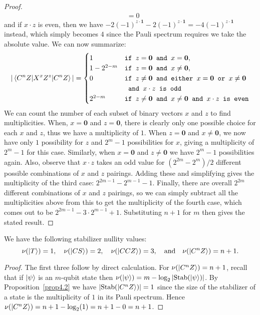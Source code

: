 \documentclass[12pt]{dalthesis}
\begin{document}
\begin{proof}
\begin{equation*}
\begin{split}
& = 0
\end{split}
\end{equation*}
and if $x \cdot z$ is even, then we have $-2(-1)^{z \cdot \textbf{1}} - 2(-1)^{z \cdot \textbf{1}} = -4(-1)^{z \cdot \textbf{1}}$ instead, which simply becomes $4$ since the Pauli spectrum requires we take the absolute value. We can now summarize:
\begin{equation*}
|\braket{C^n Z|X^xZ^z|C^n Z}| = \begin{cases}
1 & \texttt{if } z = \textbf{0} \texttt{ and } x = \textbf{0}, \\
1 - 2^{2-m} & \texttt{if } z = \textbf{0} \texttt{ and } x \neq \textbf{0}, \\
0 & \texttt{if } z \neq \textbf{0} \texttt{ and either } x = \textbf{0} \texttt{ or } x \neq \textbf{0} \\
& \texttt{ and }x \cdot z \texttt{ is odd} \\
2^{2-m} & \texttt{if } z \neq \textbf{0} \texttt{ and } x \neq \textbf{0}
 \texttt{ and } x \cdot z \texttt{ is even}
\end{cases}
\end{equation*}
We can count the number of each subset of binary vectors $x$ and $z$ to find multiplicities. When, $x=\textbf{0}$ and $z = \textbf{0}$, there is clearly only one possible choice for each $x$ and $z$, thus we have a multiplicity of $1$. When $z = \textbf{0}$ and $x \neq \textbf{0}$, we now have only $1$ possibility for $z$ and $2^{m} - 1$ possibilities for $x$, giving a multiplicity of $2^{m} - 1$ for this case. Similarly, when $x = \textbf{0}$ and $z \neq \textbf{0}$ we have $2^{m} - 1$ possibilities again. Also, observe that $x \cdot z$ takes an odd value for $(2^{2m}-2^{m})/2$ different possible combinations of $x$ and $z$ pairings. Adding these and simplifying gives the multiplicity of the third case: $2^{2m-1} - 2^{m-1} - 1$. Finally, there are overall $2^{2m}$ different combinations of $x$ and $z$ pairings, so we can simply subtract all the multiplicities above from this to get the multiplicity of the fourth case, which comes out to be $2^{2m-1} - 3 \cdot 2^{m-1} + 1$. Substituting $n+1$ for $m$ then gives the stated result.
\end{proof}

\begin{corollary}
\label{nu values}
We have the following stabilizer nullity values: 
\[
\nu (\ket{T}) = 1, \quad \nu (\ket{CS}) = 2, \quad \nu (\ket{CCZ}) = 3, \quad \mbox{and} \quad \nu (\ket{C^n Z}) = n+1.
\]
\end{corollary}
\begin{proof}

The first three follow by direct calculation. For $\nu (\ket{C^n Z}) =
n+1$, recall that if $\ket{\psi}$ is an $m$-qubit state then $\nu
(\ket{\psi}) = m - \log_2|\mathrm{Stab}(\ket{\psi})|$. By
Proposition~\ref{prop4.2} we have $|\mathrm{Stab}(\ket{C^n Z})| = 1$ since the
size of the stabilizer of a state is the multiplicity of $1$ in its
Pauli spectrum. Hence $\nu (\ket{C^n Z}) = n+1 - \log_2 (1) = n+1-0 =
n+1$.
\end{proof}
\end{document}
